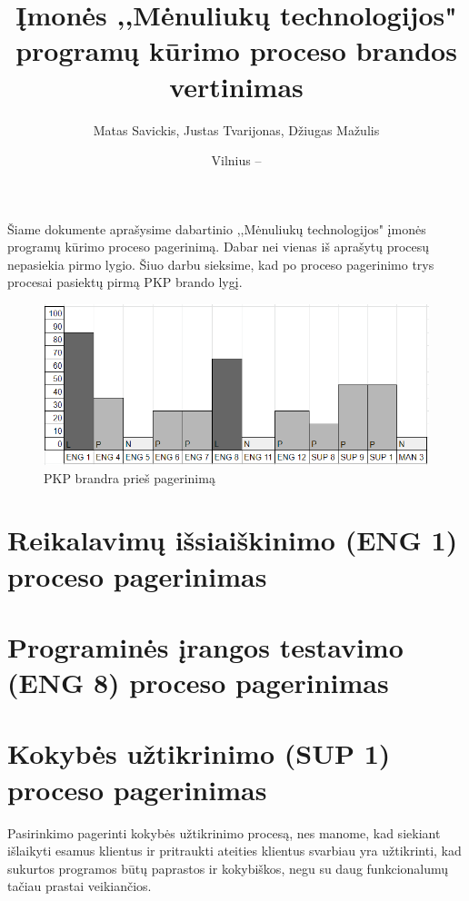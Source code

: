 \documentclass{VUMIFPSkursinis}
\title{Įmonės ,,Mėnuliukų technologijos" programų kūrimo proceso brandos vertinimas}
\author{Matas Savickis, Justas Tvarijonas, Džiugas Mažulis}
\date{Vilnius – \the\year}
\begin{document}
\maketitle

\tableofcontents

	Šiame dokumente aprašysime dabartinio ,,Mėnuliukų technologijos" įmonės programų kūrimo proceso pagerinimą. 
	Dabar nei vienas iš aprašytų procesų nepasiekia pirmo lygio.
	Šiuo darbu sieksime, kad po proceso pagerinimo trys procesai pasiektų pirmą PKP brando lygį.
	\begin{figure}[htbp]
		\includegraphics[scale=1]{img/ProcPries}
		\caption{PKP brandra prieš pagerinimą} %
		\label{img:pkpPries}
	\end{figure}

\section{Reikalavimų išsiaiškinimo (ENG 1) proceso pagerinimas}
\section{Programinės įrangos testavimo (ENG 8) proceso pagerinimas}	
\section{Kokybės užtikrinimo (SUP 1) proceso pagerinimas}
	Pasirinkimo pagerinti kokybės užtikrinimo procesą, nes manome, kad siekiant išlaikyti esamus klientus ir pritraukti ateities klientus svarbiau yra užtikrinti, 
	kad sukurtos programos būtų paprastos ir kokybiškos, negu su daug funkcionalumų tačiau prastai veikiančios.
\end{document}
